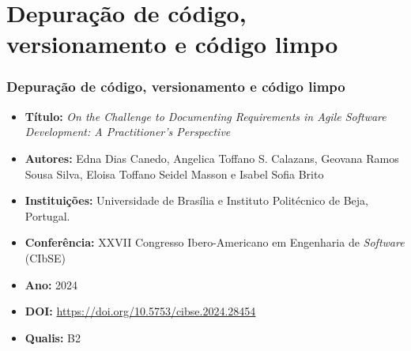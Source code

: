 \section{Depuração de código, versionamento e código limpo}
\begin{frame}
	\frametitle{Depuração de código, versionamento e código limpo}
	\begin{itemize}
		\item \textbf{Título:}	\textit{On the Challenge to Documenting Requirements in Agile Software Development: A Practitioner’s Perspective}
		
		
		\item \textbf{Autores:}	Edna Dias Canedo, Angelica Toffano S. Calazans, Geovana Ramos Sousa Silva, Eloisa Toffano Seidel Masson e Isabel Sofia Brito 
		
		\item \textbf{Instituições:} Universidade de Brasília e Instituto Politécnico de Beja, Portugal.
		
		\item \textbf{Conferência:}	XXVII Congresso Ibero-Americano em Engenharia de \textit{Software} (CIbSE) 
		
		\item \textbf{Ano:}	2024 
		
		\item \textbf{DOI:}	\url{https://doi.org/10.5753/cibse.2024.28454}
		
		\item \textbf{Qualis:} B2
	\end{itemize}
\end{frame}



